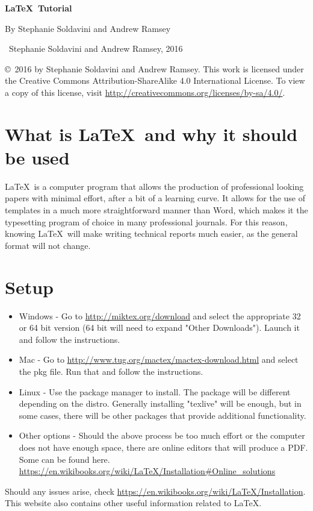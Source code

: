 \documentclass[11pt]{article}
\begin{document}
\vspace*{2.5cm} 

\begin{center}
    \LARGE
    \textbf{\LaTeX\ Tutorial}\\ 

    \medskip

    \large
    By Stephanie Soldavini and Andrew Ramsey 
\end{center}
\vfill
\ccbysa\ Stephanie Soldavini and Andrew Ramsey, 2016 

\copyright\ 2016 by Stephanie Soldavini and Andrew Ramsey. This work is licensed under the Creative Commons Attribution-ShareAlike 4.0 International License. To view a copy of this license, visit \url{http://creativecommons.org/licenses/by-sa/4.0/}.

\newpage


\section*{What is \LaTeX\ and why it should be used}
\LaTeX\ is a computer program that allows the production of professional looking papers with minimal effort, after a bit of a learning curve. It allows for the use of templates in a much more straightforward manner than Word, which makes it the typesetting program of choice in many professional journals. For this reason, knowing \LaTeX\ will make writing technical reports much easier, as the general format will not change.


\section*{Setup}
\begin{itemize} 
    \item Windows - Go to \url{http://miktex.org/download} and select the appropriate 32 or 64 bit version (64 bit will need to expand "Other Downloads"). Launch it and follow the instructions.

    \item Mac - Go to \url{http://www.tug.org/mactex/mactex-download.html} and select the pkg file. Run that and follow the instructions. 

    \item Linux - Use the package manager to install. The package will be different depending on the distro. Generally installing "texlive" will be enough, but in some cases, there will be other packages that provide additional functionality. 

    \item Other options - Should the above process be too much effort or the computer does not have enough space, there are online editors that will produce a PDF. Some can be found here. \url{https://en.wikibooks.org/wiki/LaTeX/Installation#Online_solutions} 


\end{itemize}
        Should any issues arise, check \url{https://en.wikibooks.org/wiki/LaTeX/Installation}. This website also contains other useful information related to \LaTeX.
\end{document}
